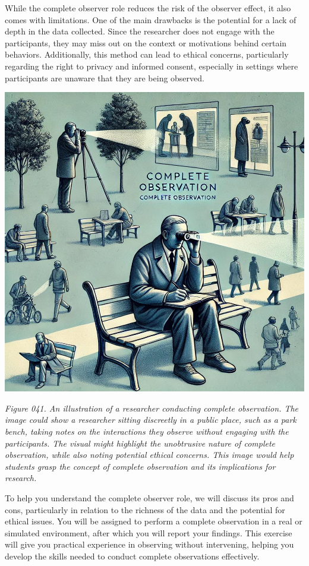 \documentclass[
]{book}
\begin{document}
While the complete observer role reduces the risk of the observer effect, it also comes with limitations. One of the main drawbacks is the potential for a lack of depth in the data collected. Since the researcher does not engage with the participants, they may miss out on the context or motivations behind certain behaviors. Additionally, this method can lead to ethical concerns, particularly regarding the right to privacy and informed consent, especially in settings where participants are unaware that they are being observed.

\includegraphics[width=1\linewidth,height=\textheight,keepaspectratio]{images/fig041.jpg}

\emph{Figure 041. An illustration of a researcher conducting complete observation. The image could show a researcher sitting discreetly in a public place, such as a park bench, taking notes on the interactions they observe without engaging with the participants. The visual might highlight the unobtrusive nature of complete observation, while also noting potential ethical concerns. This image would help students grasp the concept of complete observation and its implications for research.}

To help you understand the complete observer role, we will discuss its pros and cons, particularly in relation to the richness of the data and the potential for ethical issues. You will be assigned to perform a complete observation in a real or simulated environment, after which you will report your findings. This exercise will give you practical experience in observing without intervening, helping you develop the skills needed to conduct complete observations effectively.
\end{document}
